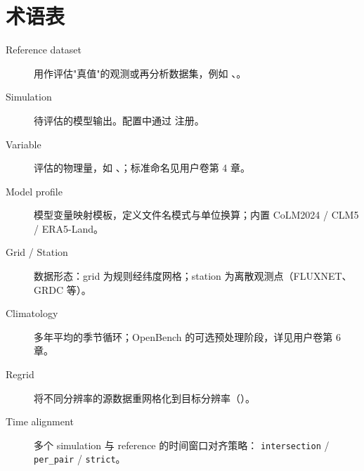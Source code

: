 
\section*{术语表}

\begin{description}
  \item[Reference dataset]
    用作评估"真值"的观测或再分析数据集，例如 、。
  \item[Simulation]
    待评估的模型输出。配置中通过  注册。
  \item[Variable]
    评估的物理量，如 、；标准命名见用户卷第 4 章。
  \item[Model profile]
    模型变量映射模板，定义文件名模式与单位换算；内置 CoLM2024 / CLM5 / ERA5-Land。
  \item[Grid / Station]
    数据形态：grid 为规则经纬度网格；station 为离散观测点（FLUXNET、GRDC 等）。
  \item[Climatology]
    多年平均的季节循环；OpenBench 的可选预处理阶段，详见用户卷第 6 章。
  \item[Regrid]
    将不同分辨率的源数据重网格化到目标分辨率（）。
  \item[Time alignment]
    多个 simulation 与 reference 的时间窗口对齐策略：
    \texttt{intersection} / \texttt{per\_pair} / \texttt{strict}。
\end{description}
